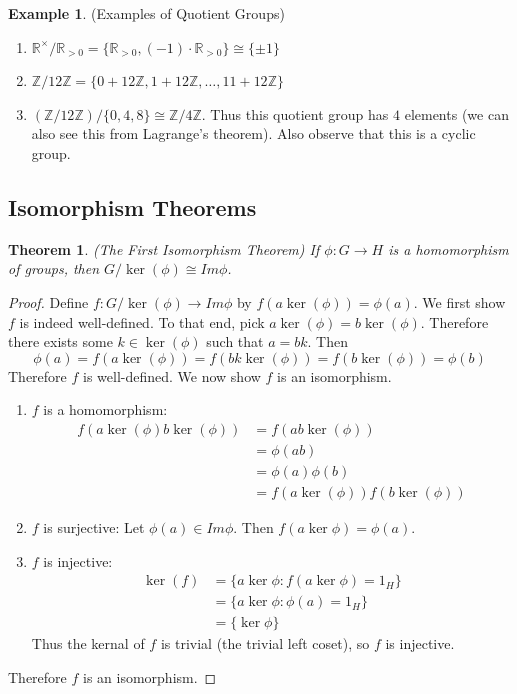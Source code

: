 \documentclass[12pt]{article}
\newtheorem{theorem}{Theorem}
\theoremstyle{definition}
\newtheorem{example}{Example}
\theoremstyle{definition}
\begin{document}
\begin{example}(Examples of Quotient Groups)
\begin{enumerate}
	\item $\mathbb{R}^{\times} / \mathbb{R}_{> 0} = \{\mathbb{R}_{> 0}, (-1) \cdot \mathbb{R}_{> 0}\} \cong \{\pm 1\}$
	\item $\mathbb{Z} / 12 \mathbb{Z} = \{0 + 12 \mathbb{Z}, 1 + 12 \mathbb{Z}, \ldots, 11 + 12 \mathbb{Z} \} $
	\item $(\mathbb{Z} / 12 \mathbb{Z}) / \{0, 4, 8 \} \cong \mathbb{Z} / 4 \mathbb{Z}$. Thus this quotient group has $4$ elements (we can also see this from Lagrange's theorem). Also observe that this is a cyclic group.
\end{enumerate}
\end{example}

\subsection{Isomorphism Theorems}

\begin{theorem}(The First Isomorphism Theorem)
If $\phi:G\to H$ is a homomorphism of groups, then $G / \ker(\phi) \cong Im \phi$. 
\end{theorem}

\begin{proof}
Define $f: G / \ker(\phi) \to Im \phi$ by $f(a \ker(\phi)) = \phi(a)$. We first show $f$ is indeed well-defined. To that end, pick $a \ker(\phi) = b \ker(\phi)$. Therefore there exists some $k \in \ker(\phi)$ such that $a = bk$. Then
\begin{equation}
	\phi(a) = f(a \ker(\phi)) = f(bk \ker(\phi)) = f(b \ker(\phi)) = \phi(b)
\end{equation}
Therefore $f$ is well-defined. We now show $f$ is an isomorphism. 

\begin{enumerate}
	\item $f$ is a homomorphism: 
	\begin{align*}
		f(a \ker(\phi) b \ker(\phi)) &= f(ab \ker(\phi)) \\
		&=  \phi(ab) \\
		&= \phi(a)\phi(b) \tag{$\phi$ is a homomorphism} \\
		&= f(a \ker(\phi)) f(b \ker(\phi))
	\end{align*}

	\item $f$ is surjective: Let $\phi(a) \in Im \phi$. Then $f(a \ker \phi) = \phi(a)$. 
	\item $f$ is injective:  
	\begin{align*}
		\ker(f) &= \{a \ker \phi : f(a \ker \phi) = 1_H \} \\
		&= \{a \ker \phi : \phi(a) = 1_H \} \\
		&= \{\ker \phi \} 
	\end{align*}
	Thus the kernal of $f$ is trivial (the trivial left coset), so $f$ is injective. 
\end{enumerate}

Therefore $f$ is an isomorphism.
\end{proof}
\end{document}
